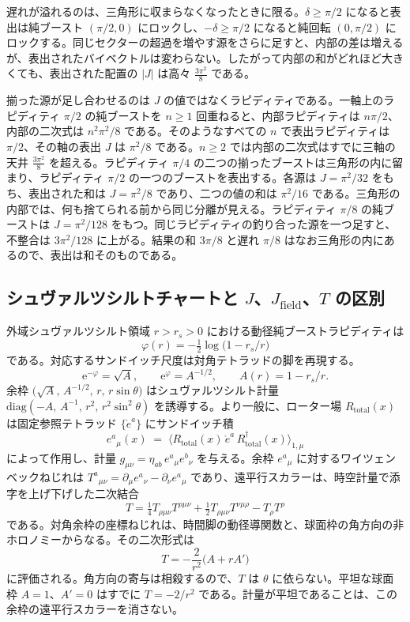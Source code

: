 \documentclass[a4paper]{article}
\newcommand{\Jbound}{\frac{3\pi^2}{8}}
\begin{document}
遅れが溢れるのは、三角形に収まらなくなったときに限る。$\delta\ge\pi/2$ になると表出は純ブースト $(\pi/2,0)$ にロックし、$-\delta\ge\pi/2$ になると純回転 $(0,\pi/2)$ にロックする。同じセクターの超過を増やす源をさらに足すと、内部の差は増えるが、表出されたバイベクトルは変わらない。したがって内部の和がどれほど大きくても、表出された配置の $|J|$ は高々 $\Jbound$ である。

揃った源が足し合わせるのは $J$ の値ではなくラピディティである。一軸上のラピディティ $\pi/2$ の純ブーストを $n\ge 1$ 回重ねると、内部ラピディティは $n\pi/2$、内部の二次式は $n^2\pi^2/8$ である。そのようなすべての $n$ で表出ラピディティは $\pi/2$、その軸の表出 $J$ は $\pi^2/8$ である。$n\ge 2$ では内部の二次式はすでに三軸の天井 $\Jbound$ を超える。ラピディティ $\pi/4$ の二つの揃ったブーストは三角形の内に留まり、ラピディティ $\pi/2$ の一つのブーストを表出する。各源は $J=\pi^2/32$ をもち、表出された和は $J=\pi^2/8$ であり、二つの値の和は $\pi^2/16$ である。三角形の内部では、何も捨てられる前から同じ分離が見える。ラピディティ $\pi/8$ の純ブーストは $J=\pi^2/128$ をもつ。同じラピディティの釣り合った源を一つ足すと、不整合は $3\pi^2/128$ に上がる。結果の和 $3\pi/8$ と遅れ $\pi/8$ はなお三角形の内にあるので、表出は和そのものである。

\subsection{\texorpdfstring{シュヴァルツシルトチャートと $J$、$J_{\mathrm{field}}$、$T$ の区別}{シュヴァルツシルトチャートと J、J field、T の区別}}
\label{subsec:schwarzschild-chart}

外域シュヴァルツシルト領域 $r>r_s>0$ における動径純ブーストラピディティは
\[
\varphi(r) = -\tfrac12\log\bigl(1-r_s/r\bigr)
\]
である。対応するサンドイッチ尺度は対角テトラッドの脚を再現する。
\[
\mathrm{e}^{-\varphi}=\sqrt{A},\qquad \mathrm{e}^{\varphi}=A^{-1/2},\qquad A(r)=1-r_s/r.
\]
余枠 $\bigl(\sqrt{A},\,A^{-1/2},\,r,\,r\sin\theta\bigr)$ はシュヴァルツシルト計量~\cite{schwarzschild1916} $\mathrm{diag}(-A,\,A^{-1},\,r^2,\,r^2\sin^2\theta)$ を誘導する。より一般に、ローター場 $R_{\mathrm{total}}(x)$ は固定参照テトラッド $\{\mathring{e}^a\}$ にサンドイッチ積
\[
e^a{}_\mu(x) \;=\; \langle R_{\mathrm{total}}(x)\, \mathring{e}^a\, R_{\mathrm{total}}^\dagger(x) \rangle_{1,\mu}
\]
によって作用し、計量 $g_{\mu\nu}=\eta_{ab}\,e^a{}_\mu e^b{}_\nu$ を与える。余枠 $e^a{}_\mu$ に対するワイツェンベックねじれは $T^a{}_{\mu\nu}=\partial_\mu e^a{}_\nu-\partial_\nu e^a{}_\mu$ であり、遠平行スカラーは、時空計量で添字を上げ下げした二次結合
\[
T=\tfrac14 T_{\rho\mu\nu}T^{\rho\mu\nu}+\tfrac12 T_{\rho\mu\nu}T^{\nu\mu\rho}-T_\rho T^\rho
\]
である。対角余枠の座標ねじれは、時間脚の動径導関数と、球面枠の角方向の非ホロノミーからなる。その二次形式は
\begin{equation}
\label{eq:schwarzschild-T}
T=-\frac{2}{r^2}\bigl(A+r A'\bigr)
\end{equation}
に評価される。角方向の寄与は相殺するので、$T$ は $\theta$ に依らない。平坦な球面枠 $A=1$、$A'=0$ はすでに $T=-2/r^2$ である。計量が平坦であることは、この余枠の遠平行スカラーを消さない。
\end{document}
